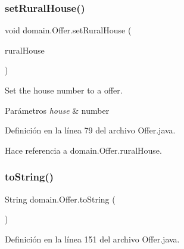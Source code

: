 \subsubsection{\texorpdfstring{setRuralHouse()}{setRuralHouse()}}
{\footnotesize\ttfamily void domain.\+Offer.\+set\+Rural\+House (\begin{DoxyParamCaption}\item[{\mbox{\hyperlink{classdomain_1_1_rural_house}{Rural\+House}}}]{rural\+House }\end{DoxyParamCaption})}



Set the house number to a offer. 


\begin{DoxyParams}{Parámetros}
{\em house} & number \\
\hline
\end{DoxyParams}


Definición en la línea 79 del archivo Offer.\+java.


\begin{DoxyCode}{0}

\end{DoxyCode}


Hace referencia a domain.\+Offer.\+rural\+House.

\mbox{\label{classdomain_1_1_offer_a8838b2d4c6616394f1829d4dc5572952}} 
\subsubsection{\texorpdfstring{toString()}{toString()}}
{\footnotesize\ttfamily String domain.\+Offer.\+to\+String (\begin{DoxyParamCaption}{ }\end{DoxyParamCaption})}



Definición en la línea 151 del archivo Offer.\+java.


